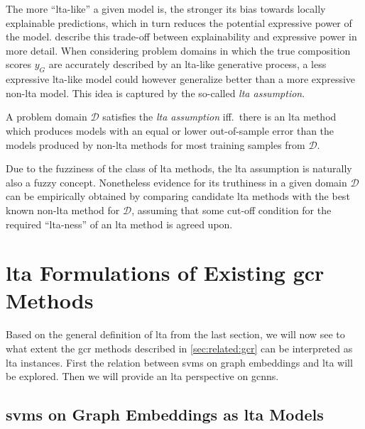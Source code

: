 The more ``\acs{lta}-like'' a given model is, the stronger its bias towards locally explainable predictions, which in turn reduces the potential expressive power of the model.
\citet{Gilpin2018} describe this trade-off between explainability and expressive power in more detail.
When considering problem domains in which the true composition scores $y_G$ are accurately described by an \acs{lta}-like generative process, a less expressive \ac{lta}-like model could however generalize better than a more expressive non-\ac{lta} model.
This idea is captured by the so-called \textit{\ac{lta} assumption}.
\begin{defn}
	A problem domain $\mathcal{D}$ satisfies the \textit{\ac{lta} assumption} iff.\ there is an \ac{lta} method which produces models with an equal or lower out-of-sample error than the models produced by non-\acs{lta} methods for most training samples from $\mathcal{D}$.
\end{defn}
Due to the fuzziness of the class of \ac{lta} methods, the \ac{lta} assumption is naturally also a fuzzy concept.
Nonetheless evidence for its truthiness in a given domain $\mathcal{D}$ can be empirically obtained by comparing candidate \ac{lta} methods with the best known non-\ac{lta} method for $\mathcal{D}$, assuming that some cut-off condition for the required ``\ac{lta}-ness'' of an \ac{lta} method is agreed upon.

\section{\acs*{lta} Formulations of Existing \acs*{gcr} Methods}%
\label{sec:ltag:formulation}

Based on the general definition of \ac{lta} from the last section, we will now see to what extent the \ac{gcr} methods described in \cref{sec:related:gcr} can be interpreted as \ac{lta} instances.
First the relation between \acp{svm} on graph embeddings and \ac{lta} will be explored.
Then we will provide an \ac{lta} perspective on \acp{gcnn}.

\subsection{\acsp*{svm} on Graph Embeddings as \acs*{lta} Models}%
\label{sec:ltag:formulation:svm}

